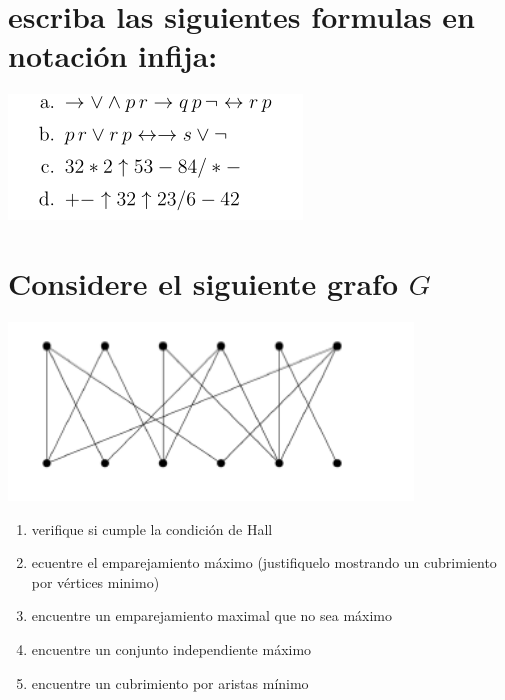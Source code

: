 \documentclass[10pt,a4paper]{article} %
\begin{document}

        \section{escriba las siguientes formulas en notación infija:}
            \begin{center}
                \includegraphics[width=0.5\linewidth]{form14.png}
            \end{center}




        \section{Considere el siguiente grafo $G$}
            \begin{center}
                \includegraphics[width=0.4\linewidth]{ultimografo.png}
            \end{center}

            \begin{enumerate}
                \item {verifique si cumple la condición de Hall}
                \item {ecuentre el emparejamiento máximo (justifiquelo
                    mostrando un cubrimiento por vértices minimo)}
                \item {encuentre un emparejamiento maximal que no sea máximo}
                \item {encuentre un conjunto independiente máximo }
                \item {encuentre un cubrimiento por aristas mínimo}
            \end{enumerate}








    \nocite{*}
    
    
\end{document}
